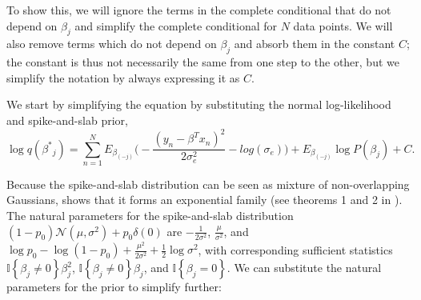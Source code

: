 %
To show this, we will ignore the terms in the complete conditional that do not depend on $\beta_j$ and simplify the complete conditional for $N$ data points.
%
We will also remove terms which do not depend on $\beta_j$ and absorb them in the constant $C$; the constant is thus not necessarily the same from one step to the other, but we simplify the notation by always expressing it as $C$.
%

%
We start by simplifying the equation by substituting the normal log-likelihood and spike-and-slab prior,
\begin{equation}
    \log q(\beta^{*}{_j}) = \sum_{n=1}^N E_{\beta_{(-j)}} \Big(- \frac{(y_n - \beta^T x_n)^2}{2 \sigma_e^2}  - log(\sigma_{e}) \Big)+ E_{\beta_{(-j)}}  \log P(\beta_j) + C.
\end{equation}

%
Because the spike-and-slab distribution can be seen as mixture of non-overlapping Gaussians, \cite{spence2020flexible} shows that it forms an exponential family (see theorems 1 and 2 in \cite{spence2020flexible}).
%
The natural parameters for the spike-and-slab distribution $(1-p_0) \mathcal{N}(\mu, \sigma^2) + p_0 \delta(0)$ are $-\frac{1}{2\sigma^2}$, $\frac{\mu}{\sigma^2}$, and $\log p_0 - \log (1-p_0) + \frac{\mu^2}{2\sigma^2} + \frac{1}{2}\log \sigma^2$, with corresponding sufficient statistics $\mathbb{I}\left\{\beta_j \ne 0\right\} \beta_j^2$, $\mathbb{I}\left\{\beta_j \ne 0\right\} \beta_j$, and $\mathbb{I}\left\{\beta_j = 0\right\}$.
%
We can substitute the natural parameters for the prior to simplify further:

